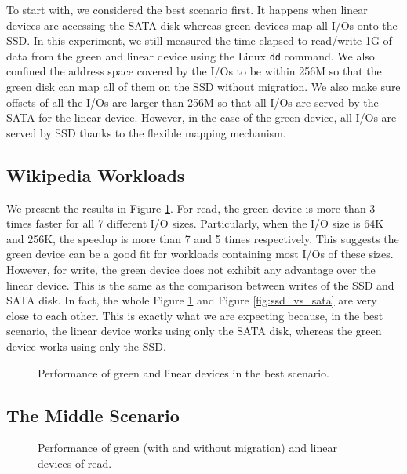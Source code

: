 To start with, we considered the best scenario first. It happens when
linear devices are accessing the SATA disk whereas green devices map
all I/Os onto the SSD.  In this experiment, we still measured the time
elapsed to read/write 1G of data from the green and linear device
using the Linux \texttt{dd} command.  We also confined the address
space covered by the I/Os to be within 256M so that the green disk can
map all of them on the SSD without migration.  We also make sure
offsets of all the I/Os are larger than 256M so that all I/Os are
served by the SATA for the linear device. However, in the case of the
green device, all I/Os are served by SSD thanks to the flexible
mapping mechanism.  

\subsection{Wikipedia Workloads}

We present the results in Figure \ref{fig:best}.  For read, the green
device is more than 3 times faster for all 7 different I/O sizes.
Particularly, when the I/O size is 64K and 256K, the speedup is more
than 7 and 5 times respectively. This suggests the green device can be
a good fit for workloads containing most I/Os of these sizes. However,
for write, the green device does not exhibit any advantage over the
linear device. This is the same as the comparison between writes of
the SSD and SATA disk. In fact, the whole Figure \ref{fig:best} and
Figure \ref{fig:ssd_vs_sata} are very close to each other. This is
exactly what we are expecting because, in the best scenario, the
linear device works using only the SATA disk, whereas the green device
works using only the SSD.

\begin{figure}[t]
\begin{centering}
\caption{Performance of green and linear devices in the best
scenario.}
\label{fig:best}
\end{centering}
\end{figure}

\subsection{The Middle Scenario}

\begin{figure}[t]
\begin{centering}
\caption{Performance of green (with and without migration) and linear
devices of read.}
\label{fig:evenread}
\end{centering}
\end{figure}

